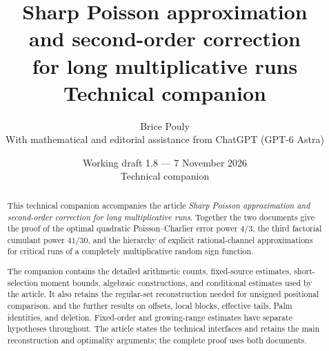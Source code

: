 \documentclass[11pt,a4paper]{article}
\title{\bfseries Sharp Poisson approximation\\and second-order correction\\for long multiplicative runs\\[9pt]\large Technical companion}
\author{Brice Pouly\\[5pt]
 \small With mathematical and editorial assistance from ChatGPT (GPT-6 Astra)}
\date{\small Working draft 1.8 --- 7 November 2026\\[3pt]Technical companion}
\begin{document}
\maketitle
\thispagestyle{plain}
\begin{abstract}
This technical companion accompanies the article \emph{Sharp Poisson
approximation and second-order correction for long multiplicative runs}.
Together the two documents give the proof of the optimal quadratic
Poisson--Charlier error power \(4/3\), the third factorial cumulant
power \(41/30\), and the hierarchy of explicit rational-channel
approximations for critical runs of a completely multiplicative
random sign function.

The companion contains the detailed arithmetic counts, fixed-source
estimates, short-selection moment bounds, algebraic constructions,
and conditional estimates used by the article. It also retains the
regular-set reconstruction needed for unsigned positional comparison,
and the further results on offsets, local blocks, effective tails,
Palm identities, and deletion. Fixed-order and growing-range
estimates have separate hypotheses throughout. The article states
the technical interfaces and retains the main reconstruction and
optimality arguments; the complete proof uses both documents.
\end{abstract}
\clearpage
\begingroup
\small
\setlength{\parskip}{0pt}
\tableofcontents
\endgroup
\clearpage























\clearpage

\end{document}
